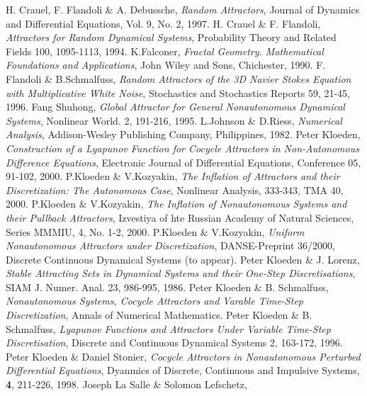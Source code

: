 \begin{thebibliography}{99}
  H. Crauel, F. Flandoli \& A. Debussche,
  \emph{Random Attractors},
  Journal of Dynamics and Differential Equations,
  Vol. 9, No. 2, 1997.
  H. Crauel \& F. Flandoli,
  \emph{Attractors for Random Dynamical Systems},
  Probability Theory and Related Fields 100,  1095-1113, 1994.
  K.Falconer,
  \emph{Fractal Geometry. Mathematical Foundations and Applications},
  John Wiley and Sons,
  Chichester, 1990.
  F. Flandoli \& B.Schmalfuss,
  \emph{Random Attractors of the 3D Navier Stokes Equation with Multiplicative
  White Noise},
  Stochastics and Stochastics Reports 59,  21-45, 1996.
  Fang Shuhong,
  \emph{Global Attractor for General Nonautonomous Dynamical Systems},
  Nonlinear World. 2,  191-216, 1995.
  L.Johnson \& D.Riess,
  \emph{Numerical Analysis},
  Addison-Wesley Publishing Company,
  Philippines, 1982.
  Peter Kloeden,
  \emph{Construction of a Lyapunov Function for Cocycle Attractors in
  Non-Autonomous Difference Equations},
  Electronic Journal of Differential Equations,
  Conference 05,  91-102, 2000.
  P.Kloeden \& V.Kozyakin,
  \emph{The Inflation of Attractors and their Discretization: The Autonomous
              Case},
  Nonlinear Analysis,  333-343, TMA 40, 2000.
  P.Kloeden \& V.Kozyakin,
  \emph{The Inflation of Nonautonomous Systems and their Pullback Attractors},
  Izvestiya of hte Russian Academy of Natural Sciences, Series MMMIU, 4, No.
                 1-2, 2000.
  P.Kloeden \& V.Kozyakin,
  \emph{Uniform Nonautonomous Attractors under Discretization},
  DANSE-Preprint 36/2000, Discrete Continuous Dynamical Systems (to appear).
  Peter Kloeden \& J. Lorenz,
  \emph{Stable Attracting Sets in Dynamical Systems and their
  One-Step Discretisations},
  SIAM J. Numer. Anal. 23,  986-995, 1986.
  Peter Kloeden \& B. Schmalfuss,
  \emph{Nonautonomous Systems, Cocycle Attractors and Varable Time-Step
          Discretization},
  Annals of Numerical Mathematics.
  Peter Kloeden \& B. Schmalfuss,
  \emph{Lyapunov Functions and Attractors Under Variable Time-Step
  Discretisation},
  Discrete and Continuous Dynamical Systems 2, 163-172, 1996.
  Peter Kloeden \& Daniel Stonier,
  \emph{Cocycle Attractors in Nonautonomous Perturbed Differential
  Equations},
  Dyanmics of Discrete, Continuous and Impulsive Systems, \textbf{4},
              211-226, 1998.
  Joseph La Salle \& Solomon Lefschetz,

\end{thebibliography}
